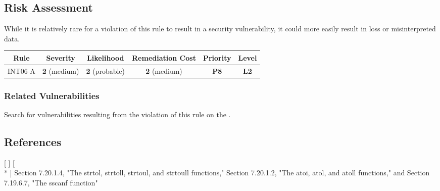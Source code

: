    \subsection{Risk Assessment}

   While it is relatively rare for a violation of this rule to result in a security vulnerability, it could more easily result in loss or misinterpreted data.

   \begin{tabular}[c]{| c| c| c| c| c| c|}
   \hline
   {\bf Rule} & {\bf Severity} & {\bf Likelihood} & {\bf Remediation Cost} & {\bf Priority} & {\bf Level} \\ \hline
   INT06-A & {\bf 2} (medium) & {\bf 2} (probable) & {\bf 2} (medium) & {\bf P8} & {\bf L2} \\ \hline
   \end{tabular}
   \subsubsection{Related Vulnerabilities}

   Search for vulnerabilities resulting from the violation of this rule on the  .
   \subsection{References}

   [  ] [ \\*
    ] Section 7.20.1.4, "The strtol, strtoll, strtoul, and strtoull functions," Section 7.20.1.2, "The atoi, atol, and atoll functions," and Section 7.19.6.7, "The sscanf function"
